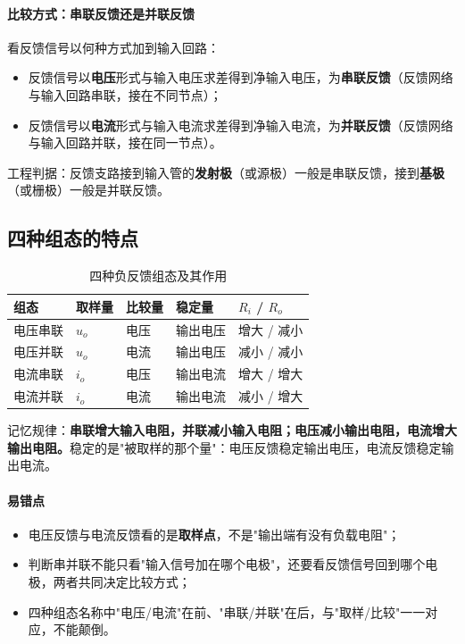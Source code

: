 \paragraph{比较方式：串联反馈还是并联反馈}
看反馈信号以何种方式加到输入回路：
\begin{itemize}
    \item 反馈信号以\textbf{电压}形式与输入电压求差得到净输入电压，为\textbf{串联反馈}（反馈网络与输入回路串联，接在不同节点）；
    \item 反馈信号以\textbf{电流}形式与输入电流求差得到净输入电流，为\textbf{并联反馈}（反馈网络与输入回路并联，接在同一节点）。
\end{itemize}
工程判据：反馈支路接到输入管的\textbf{发射极}（或源极）一般是串联反馈，接到\textbf{基极}（或栅极）一般是并联反馈。

\subsection{四种组态的特点}

\begin{table}[htbp]
\centering
\caption{四种负反馈组态及其作用}
\begin{tabular}{@{}lllll@{}}
\hline
组态 & 取样量 & 比较量 & 稳定量 & $R_i$ / $R_o$ \\
\hline
电压串联 & $u_o$ & 电压 & 输出电压 & 增大 / 减小 \\
电压并联 & $u_o$ & 电流 & 输出电压 & 减小 / 减小 \\
电流串联 & $i_o$ & 电压 & 输出电流 & 增大 / 增大 \\
电流并联 & $i_o$ & 电流 & 输出电流 & 减小 / 增大 \\
\hline
\end{tabular}
\end{table}

记忆规律：\textbf{串联增大输入电阻，并联减小输入电阻；电压减小输出电阻，电流增大输出电阻。}稳定的是"被取样的那个量"：电压反馈稳定输出电压，电流反馈稳定输出电流。

\paragraph{易错点}
\begin{itemize}
    \item 电压反馈与电流反馈看的是\textbf{取样点}，不是"输出端有没有负载电阻"；
    \item 判断串并联不能只看"输入信号加在哪个电极"，还要看反馈信号回到哪个电极，两者共同决定比较方式；
    \item 四种组态名称中"电压/电流"在前、"串联/并联"在后，与"取样/比较"一一对应，不能颠倒。
\end{itemize}

